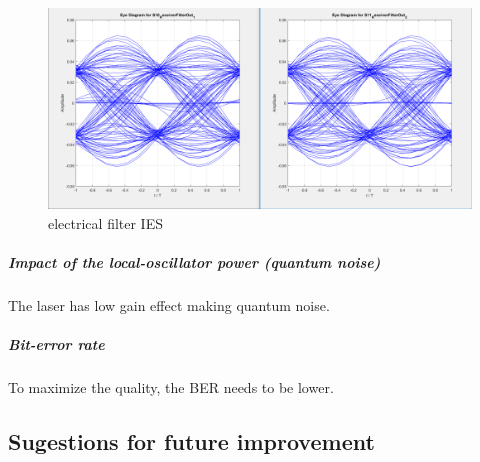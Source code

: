 \begin{figure}[hbtp]
\centering
\includegraphics[scale=0.35]{./lib/m_qam_receiver/figures/S10_S11_eye.PNG}
\caption{electrical filter IES}\label{IES filter}
\end{figure}

\subparagraph{Impact of the local-oscillator power (quantum noise)}
The laser has low gain effect making quantum noise.
\subparagraph{Bit-error rate}
To maximize the quality, the BER needs to be lower.

\subsection*{Sugestions for future improvement}

